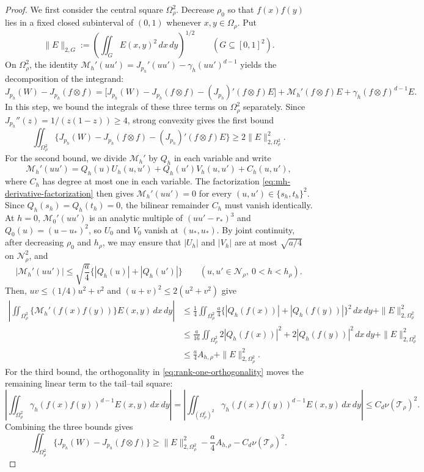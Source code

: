 \begin{proof}
We first consider the central square $\Omega_\rho^2$.  Decrease $\rho_0$ so
that $f(x)f(y)$ lies in a fixed closed subinterval of $(0,1)$ whenever
$x,y\in\Omega_\rho$.  Put
\[
  \|E\|_{2,G}
  :=\left( \iint_G E(x,y)^2\,dx\,dy \right)^{1/2}
  \qquad (G \subseteq[0,1]^2).
\]
On $\Omega_\rho^2$, the identity $\mathcal M_h'(uu')=J_{p_h}'(uu')-\gamma_h(uu')^{d-1}$ yields
the decomposition of the integrand:
\begin{equation*}
  J_{p_h}(W)-J_{p_h}(f\otimes f)
  = \bigl[ J_{p_h}(W)-J_{p_h}(f\otimes f) -(J_{p_h})'(f\otimes f)E \bigr]
  +\mathcal M_h'(f\otimes f)E
      +\gamma_h(f\otimes f)^{d-1}E.
\end{equation*}
In this step, we bound the integrals of these three terms on $\Omega_\rho^2$ separately.
Since $J_{p_h}''(z)=1/(z(1-z))\ge4$, strong convexity gives the first bound
\[
  \iint_{\Omega_\rho^2}
  \{J_{p_h}(W)-J_{p_h}(f\otimes f)-(J_{p_h})'(f\otimes f)E\}
  \ge2\|E\|_{2,\Omega_\rho^2}^2.
\]
For the second bound, we divide $\mathcal M_h'$ by $Q_h$ in each variable and write
\[
  \mathcal M_h'(uu')=Q_h(u)U_h(u,u')+Q_h(u')V_h(u,u')+C_h(u,u'),
\]
where $C_h$ has degree at most one in each variable.  The factorization
\eqref{eq:mh-derivative-factorization} then gives
$\mathcal M_h'(uu')=0$ for every $(u,u')\in\{s_h,t_h\}^2$.  Since
$Q_h(s_h)=Q_h(t_h)=0$, the bilinear remainder $C_h$ must vanish identically.
At $h=0$, $\mathcal M_0'(uu')$ is an analytic multiple of $(uu'-r_*)^3$ and
$Q_0(u)=(u-u_*)^2$, so $U_0$ and $V_0$ vanish at $(u_*,u_*)$.  By
joint continuity, after decreasing $\rho_0$ and $h_\rho$, we may ensure that
$|U_h|$ and $|V_h|$ are at most $\sqrt{a/4}$ on $\mathcal N_\rho^2$, and
\[
  |\mathcal M_h'(uu')|
  \le\sqrt{\frac a4}
    \{|Q_h(u)|+|Q_h(u')|\}
  \qquad(u,u'\in\mathcal N_\rho,\ 0<h<h_\rho).
\]
Then, $uv \le (1/4)u^2+v^2$ and
$(u+v)^2\le 2(u^2+v^2)$ give
\begin{align*}
  \left|\iint_{\Omega_\rho^2} \{\mathcal M_h'(f(x)f(y))\} E(x,y)\,dx\,dy\right|
  &\le \frac{1}{4} \iint_{\Omega_\rho^2} \frac{a}{4}\{|Q_h(f(x))|+|Q_h(f(y))|\}^2 \,dx\,dy + \|E\|_{2,\Omega_\rho^2}^2 \\
  &\le \frac{a}{16} \iint_{\Omega_\rho^2} 2|Q_h(f(x))|^2+2|Q_h(f(y))|^2 \,dx\,dy + \|E\|_{2,\Omega_\rho^2}^2 \\
  &\le \frac a4 A_{h,\rho} + \|E\|_{2,\Omega_\rho^2}^2.
\end{align*}
For the third bound, the orthogonality in \eqref{eq:rank-one-orthogonality} moves
the remaining linear term to the tail--tail square:
\[
  \left| \iint_{\Omega_\rho^2}\gamma_h(f(x)f(y))^{d-1}E(x,y)\,dx\,dy \right|
  = \left| \iint_{(\Omega_\rho^c)^2}\gamma_h(f(x)f(y))^{d-1}E(x,y)\,dx\,dy \right|
  \le C_d \nu(\mathcal T_\rho)^2.
\]
Combining the three bounds gives
\begin{equation*}
  \iint_{\Omega_\rho^2} \{J_{p_h}(W)-J_{p_h}(f\otimes f)\}
  \ge \|E\|_{2,\Omega_\rho^2}^2 -\frac a4 A_{h,\rho}-C_d\nu(\mathcal T_\rho)^2.
\end{equation*}


\end{proof}
